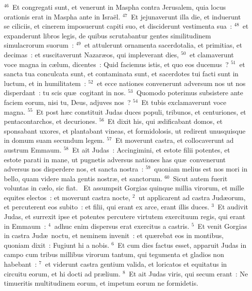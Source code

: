 ${}^{46}$~Et congregati sunt, et venerunt in Maspha contra Jerusalem, quia locus orationis erat in Maspha ante in Isra\"el.
${}^{47}$~Et jejunaverunt illa die, et induerunt se ciliciis, et cinerem imposuerunt capiti suo, et disciderunt vestimenta sua~:
${}^{48}$~et expanderunt libros legis, de quibus scrutabantur gentes similitudinem simulacrorum suorum~:
${}^{49}$~et attulerunt ornamenta sacerdotalia, et primitias, et decimas~: et suscitaverunt Nazar\ae os, qui impleverant dies,
${}^{50}$~et clamaverunt voce magna in c\ae lum, dicentes~: Quid faciemus istis, et quo eos ducemus~?
${}^{51}$~et sancta tua conculcata sunt, et contaminata sunt, et sacerdotes tui facti sunt in luctum, et in humilitatem~:
${}^{52}$~et ecce nationes convenerunt adversum nos ut nos disperdant~: tu scis qu\ae\ cogitant in nos.
${}^{53}$~Quomodo poterimus subsistere ante faciem eorum, nisi tu, Deus, adjuves nos~?
${}^{54}$~Et tubis exclamaverunt voce magna.
${}^{55}$~Et post h\ae c constituit Judas duces populi, tribunos, et centuriones, et pentacontarchos, et decuriones.
${}^{56}$~Et dixit his, qui \ae dificabant domos, et sponsabant uxores, et plantabant vineas, et formidolosis, ut redirent unusquisque in domum suam secundum legem.
${}^{57}$~Et moverunt castra, et collocaverunt ad austrum Emmaum.
${}^{58}$~Et ait Judas~: Accingimini, et estote filii potentes, et estote parati in mane, ut pugnetis adversus nationes has qu\ae\ convenerunt adversus nos disperdere nos, et sancta nostra~:
${}^{59}$~quoniam melius est nos mori in bello, quam videre mala gentis nostr\ae , et sanctorum.
${}^{60}$~Sicut autem fuerit voluntas in c\ae lo, sic fiat.
~\lettrine[lines=10,image=true,loversize=0.05,lraise=-0.03]{E}{}t assumpsit Gorgias quinque millia virorum, et mille equites electos~: et moverunt castra nocte,
${}^{2}$~ut applicarent ad castra Jud\ae orum, et percuterent eos subito~: et filii, qui erant ex arce, erant illis duces.
${}^{3}$~Et audivit Judas, et surrexit ipse et potentes percutere virtutem exercituum regis, qui erant in Emmaum~:
${}^{4}$~adhuc enim dispersus erat exercitus a castris.
${}^{5}$~Et venit Gorgias in castra Jud\ae\ noctu, et neminem invenit~: et qu\ae rebat eos in montibus, quoniam dixit~: Fugiunt hi a nobis.
${}^{6}$~Et cum dies factus esset, apparuit Judas in campo cum tribus millibus virorum tantum, qui tegumenta et gladios non habebant~:
${}^{7}$~et viderunt castra gentium valida, et loricatos et equitatus in circuitu eorum, et hi docti ad pr\ae lium.
${}^{8}$~Et ait Judas viris, qui secum erant~: Ne timueritis multitudinem eorum, et impetum eorum ne formidetis.
